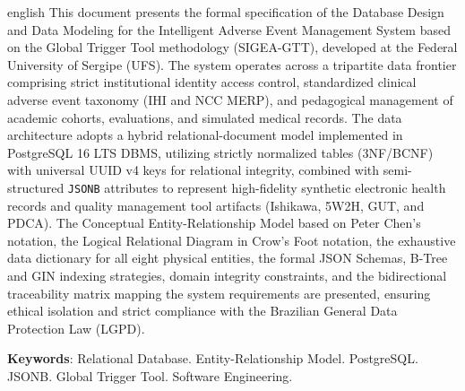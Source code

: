 \begin{resumo}[Abstract]
\begin{otherlanguage*}{english}
This document presents the formal specification of the Database Design and Data Modeling for the Intelligent Adverse Event Management System based on the Global Trigger Tool methodology (SIGEA-GTT), developed at the Federal University of Sergipe (UFS). The system operates across a tripartite data frontier comprising strict institutional identity access control, standardized clinical adverse event taxonomy (IHI and NCC MERP), and pedagogical management of academic cohorts, evaluations, and simulated medical records. The data architecture adopts a hybrid relational-document model implemented in PostgreSQL 16 LTS DBMS, utilizing strictly normalized tables (3NF/BCNF) with universal UUID v4 keys for relational integrity, combined with semi-structured \texttt{JSONB} attributes to represent high-fidelity synthetic electronic health records and quality management tool artifacts (Ishikawa, 5W2H, GUT, and PDCA). The Conceptual Entity-Relationship Model based on Peter Chen's notation, the Logical Relational Diagram in Crow's Foot notation, the exhaustive data dictionary for all eight physical entities, the formal JSON Schemas, B-Tree and GIN indexing strategies, domain integrity constraints, and the bidirectional traceability matrix mapping the system requirements are presented, ensuring ethical isolation and strict compliance with the Brazilian General Data Protection Law (LGPD).

\vspace{\onelineskip}
\noindent
\textbf{Keywords}: Relational Database. Entity-Relationship Model. PostgreSQL. JSONB. Global Trigger Tool. Software Engineering.
\end{otherlanguage*}
\end{resumo}
